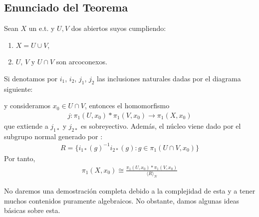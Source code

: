 \subsection{Enunciado del Teorema}
\begin{teo}\label{teo:seifert_van_kampen}
    Sean $X$ un e.t. y $U,V$ dos abiertos suyos cumpliendo:
    \begin{enumerate}
        \item $X=U\cup V$,
        \item $U$, $V$ y $U\cap V$ son arcoconexos.
    \end{enumerate}
    Si denotamos por $i_1$, $i_2$, $j_1$, $j_2$ las inclusiones naturales dadas por el diagrama siguiente:
    \begin{center}
    \end{center}
    y consideramos $x_0\in U\cap V$, entonces el homomorfismo
    \begin{gather*}
        j:\pi_1(U,x_0) \ast \pi_1(V,x_0) \to \pi_1(X,x_0)
    \end{gather*}
    que extiende a $j_{1*}$ y $j_{2*}$ es sobreyectivo. Además, el núcleo viene dado por el subgrupo normal generado por :
    \begin{gather*}
        R = \{i_{1*}(g)^{-1}i_{2*}(g) : g\in \pi_1(U\cap V,x_0)\}
    \end{gather*}
    Por tanto, 
    \begin{gather*}
        \pi_1(X,x_0) \cong \frac{\pi_1(U,x_0)\ast \pi_1(V,x_0)}{\langle R \rangle_N}
    \end{gather*}
\end{teo}

No daremos una demostración completa debido a la complejidad de esta y a tener muchos contenidos puramente algebraicos. No obstante, damos algunas ideas básicas sobre esta.\\

